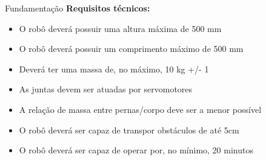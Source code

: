 \begin{frame}[t]{Fundamentação}
    \textbf{Requisitos técnicos:}
    \begin{itemize}
        \item O robô deverá possuir uma altura máxima de 500 mm
        \item O robô deverá possuir um comprimento máximo de 500 mm
        \item Deverá ter uma massa de, no máximo, 10 kg +/- 1
        \item As juntas devem ser atuadas por servomotores
        \item A relação de massa entre pernas/corpo deve ser a menor possível
        \item O robô deverá ser capaz de transpor obstáculos de até 5cm
        \item O robô deverá ser capaz de operar por, no mínimo, 20 minutos
    \end{itemize}

\end{frame}
